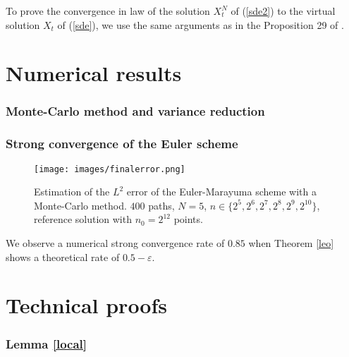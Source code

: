 \documentclass[11pt]{enstaPRE}
\begin{document}
To prove the convergence in law of the solution $X^N_t$ of (\ref{sde2}) to the virtual solution $X_t$ of (\ref{sde}), we use the same arguments as in the Proposition 29 of \cite{Fla-Iss-Rus-2017}.

\part{Numerical results}

\section{Monte-Carlo method and variance reduction}

\section{Strong convergence of the Euler scheme}

\begin{figure}[h]
    \centering
    \texttt{[image: images/finalerror.png]}
    \caption{Estimation of the $L^2$ error of the Euler-Marayuma scheme with a Monte-Carlo method. $400$ paths, $N=5$, $n\in \{2^5,2^6,2^7,2^8,2^9,2^{10}\}$, reference solution with $n_0=2^{12}$ points.}
\end{figure}

We observe a numerical strong convergence rate of $0.85$ when Theorem \ref{leo} shows a theoretical rate of $0.5-\varepsilon$.


\appendix
\part{Technical proofs}

\section{Lemma \ref{local}}
\end{document}
